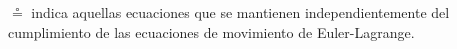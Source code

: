 \documentclass[preview]{standalone}
\begin{document}
\begin{justify}
$\circeq$ indica aquellas ecuaciones que se mantienen independientemente del cumplimiento de las ecuaciones de movimiento de Euler-Lagrange.
\end{justify}
\end{document}
